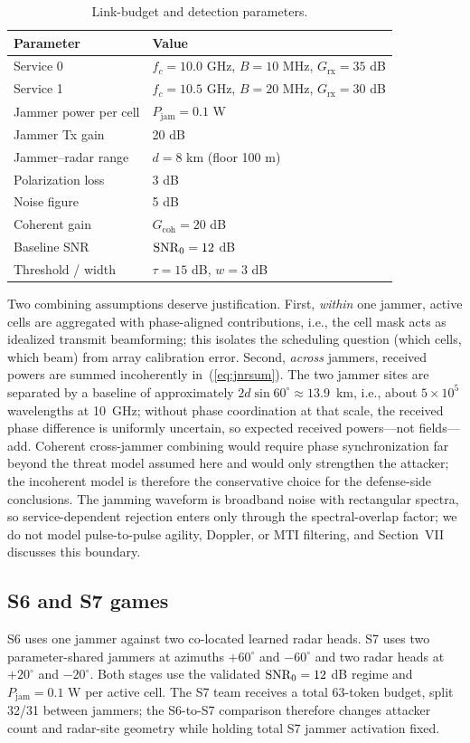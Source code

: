 \begin{table}[t]
\caption{Link-budget and detection parameters.}
\label{tab:linkbudget}
\centering
\footnotesize
\setlength{\tabcolsep}{4pt}
\begin{tabular}{ll}
\toprule
Parameter & Value \\
\midrule
Service 0 & $f_c=10.0$ GHz, $B=10$ MHz, $G_{\mathrm{rx}}=35$ dB \\
Service 1 & $f_c=10.5$ GHz, $B=20$ MHz, $G_{\mathrm{rx}}=30$ dB \\
Jammer power per cell & $P_{\mathrm{jam}}=0.1$ W \\
Jammer Tx gain & 20 dB \\
Jammer--radar range & $d=8$ km (floor 100 m) \\
Polarization loss & 3 dB \\
Noise figure & 5 dB \\
Coherent gain & $G_{\mathrm{coh}}=20$ dB \\
Baseline SNR & $\mathrm{SNR}_0=12$ dB \\
Threshold / width & $\tau=15$ dB, $w=3$ dB \\
\bottomrule
\end{tabular}
\end{table}

Two combining assumptions deserve justification. First, \emph{within} one jammer, active cells are aggregated with phase-aligned contributions, i.e., the cell mask acts as idealized transmit beamforming; this isolates the scheduling question (which cells, which beam) from array calibration error. Second, \emph{across} jammers, received powers are summed incoherently in~(\ref{eq:jnrsum}). The two jammer sites are separated by a baseline of approximately $2d\sin 60^\circ\approx13.9$~km, i.e., about $5\times10^5$ wavelengths at 10~GHz; without phase coordination at that scale, the received phase difference is uniformly uncertain, so expected received powers---not fields---add. Coherent cross-jammer combining would require phase synchronization far beyond the threat model assumed here and would only strengthen the attacker; the incoherent model is therefore the conservative choice for the defense-side conclusions. The jamming waveform is broadband noise with rectangular spectra, so service-dependent rejection enters only through the spectral-overlap factor; we do not model pulse-to-pulse agility, Doppler, or MTI filtering, and Section~VII discusses this boundary.

\subsection{S6 and S7 games}
S6 uses one jammer against two co-located learned radar heads. S7 uses two parameter-shared jammers at azimuths $+60^\circ$ and $-60^\circ$ and two radar heads at $+20^\circ$ and $-20^\circ$. Both stages use the validated $\mathrm{SNR}_0=12$ dB regime and $P_{\mathrm{jam}}=0.1$ W per active cell. The S7 team receives a total 63-token budget, split 32/31 between jammers; the S6-to-S7 comparison therefore changes attacker count and radar-site geometry while holding total S7 jammer activation fixed.

